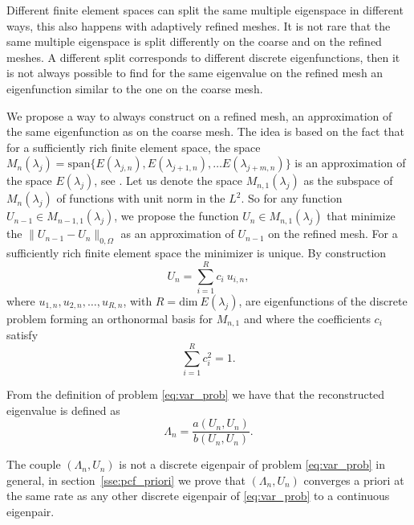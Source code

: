 \documentclass[preprint,12pt]{elsarticle}
\begin{document}
Different finite element spaces can split the same multiple eigenspace in different ways, this also happens with adaptively refined meshes. It is not rare that the same multiple eigenspace is split differently on the coarse and on the refined meshes. A different split corresponds to different discrete eigenfunctions, then it is not always possible to find for the same eigenvalue on the refined mesh an eigenfunction similar to the one on the coarse mesh.


We propose a way to always construct on a refined mesh, an approximation of the same eigenfunction as on the coarse mesh. The idea is based on the fact that for a sufficiently rich finite element space, the space $M_n(\lambda_j)=\mathrm{span}\{E(\lambda_{j,n}),E(\lambda_{j+1,n}),\dots E(\lambda_{j+m,n})\}$ is an approximation of the space $E(\lambda_j)$, see \cite{strang}. Let us denote the space $M_{n,1}(\lambda_j)$ as the subspace of $M_n(\lambda_j)$ of functions with unit norm in the $L^2$.
So for any function $U_{n-1}\in M_{n-1,1}(\lambda_j)$, we propose the function $U_{n}\in M_{n,1}(\lambda_j)$ that minimize the $\|U_{n-1}-U_{n}\|_{0,\Omega}$ as an approximation of $U_{n-1}$ on the refined mesh. For a sufficiently rich finite element space the minimizer is unique. By construction
\begin{equation}\label{eq:const}
U_n=\sum_{i=1}^{R} c_i \ u_{i,n},
\end{equation}
where $u_{1,n},u_{2,n},\dots,u_{R,n}$, with $R=\mathrm{dim}\ E(\lambda_j)$, are eigenfunctions of the discrete problem forming  an orthonormal basis for
$M_{n,1}$ and where the coefficients $c_i$ satisfy 
\begin{equation}\label{eq:cond_on_corf}
\sum_{i=1}^{R} c_i^2=1.
\end{equation}

From the definition of problem \eqref{eq:var_prob} we have that the reconstructed eigenvalue is defined as
$$
\Lambda_n=\frac{a(U_n,U_n)}{b(U_n,U_n)}.
$$

The couple $(\Lambda_n,U_n)$ is not a discrete eigenpair of problem \eqref{eq:var_prob} in general, in section~\ref{sse:pcf_priori} we prove that $(\Lambda_n,U_n)$ converges a priori at the same rate as any other discrete eigenpair of \eqref{eq:var_prob} to a continuous eigenpair.

\end{document}
